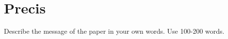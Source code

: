 \documentclass{article}
\begin{document}

\section{Precis}
Describe the message of the paper in your own words. Use 100-200
words. \\
\boxed{}

\clearpage
\printbibliography


\end{document}
